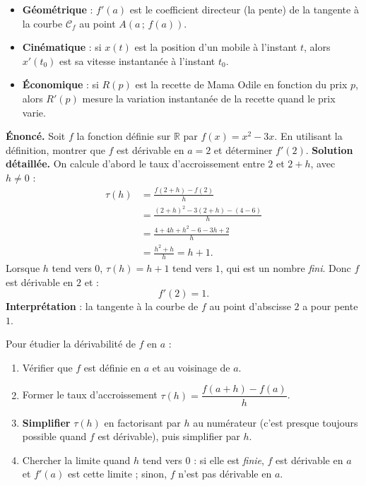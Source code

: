 \documentclass[11pt]{article}
\newcommand{\cle}[1]{{\popxbold\color{popdark}#1}}
\begin{document}
\begin{aretenir}
\begin{itemize}
\item \textbf{Géométrique} : $f'(a)$ est le \cle{coefficient directeur} (la pente) de la tangente à la courbe $\mathcal{C}_f$ au point $A(a\,;\,f(a))$.
\item \textbf{Cinématique} : si $x(t)$ est la position d'un mobile à l'instant $t$, alors $x'(t_0)$ est sa \cle{vitesse instantanée} à l'instant $t_0$.
\item \textbf{Économique} : si $R(p)$ est la recette de Mama Odile en fonction du prix $p$, alors $R'(p)$ mesure la variation instantanée de la recette quand le prix varie.
\end{itemize}
\end{aretenir}

\begin{exoresolu}
\textbf{Énoncé.} Soit $f$ la fonction définie sur $\mathbb{R}$ par $f(x) = x^2 - 3x$. En utilisant la définition, montrer que $f$ est dérivable en $a = 2$ et déterminer $f'(2)$.
\tcblower
\textbf{Solution détaillée.} On calcule d'abord le taux d'accroissement entre $2$ et $2+h$, avec $h \neq 0$ :
\begin{align*}
\tau(h) &= \frac{f(2+h)-f(2)}{h} \\
&= \frac{(2+h)^2 - 3(2+h) - (4 - 6)}{h} \\
&= \frac{4 + 4h + h^2 - 6 - 3h + 2}{h} \\
&= \frac{h^2 + h}{h} = h + 1.
\end{align*}
Lorsque $h$ tend vers $0$, $\tau(h) = h+1$ tend vers $1$, qui est un nombre \emph{fini}. Donc $f$ est dérivable en $2$ et :
\[ f'(2) = 1. \]
\textbf{Interprétation} : la tangente à la courbe de $f$ au point d'abscisse $2$ a pour pente $1$.
\end{exoresolu}

\begin{methode}
Pour étudier la dérivabilité de $f$ en $a$ :
\begin{enumerate}
\item Vérifier que $f$ est définie en $a$ et au voisinage de $a$.
\item Former le taux d'accroissement $\tau(h) = \dfrac{f(a+h)-f(a)}{h}$.
\item \textbf{Simplifier} $\tau(h)$ en factorisant par $h$ au numérateur (c'est presque toujours possible quand $f$ est dérivable), puis simplifier par $h$.
\item Chercher la limite quand $h$ tend vers $0$ : si elle est \emph{finie}, $f$ est dérivable en $a$ et $f'(a)$ est cette limite ; sinon, $f$ n'est pas dérivable en $a$.
\end{enumerate}
\end{methode}
\end{document}
